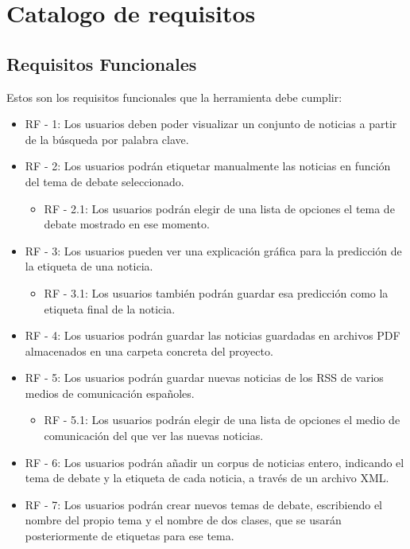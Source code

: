 \section{Catalogo de requisitos}

\subsection{Requisitos Funcionales}

Estos son los requisitos funcionales que la herramienta debe cumplir:

\begin{itemize}

\item RF - 1: Los usuarios deben poder visualizar un conjunto de noticias a partir de la búsqueda por palabra clave.

\item RF - 2: Los usuarios podrán etiquetar manualmente las noticias en función del tema de debate seleccionado.
\begin{itemize}
\item RF - 2.1: Los usuarios podrán elegir de una lista de opciones el tema de debate mostrado en ese momento.
\end{itemize}

\item RF - 3: Los usuarios pueden ver una explicación gráfica para la predicción de la etiqueta de una noticia.
\begin{itemize}
\item RF - 3.1: Los usuarios también podrán guardar esa predicción como la etiqueta final de la noticia.
\end{itemize}

\item RF - 4: Los usuarios podrán guardar las noticias guardadas en archivos PDF almacenados en una carpeta concreta del proyecto.

\item RF - 5: Los usuarios podrán guardar nuevas noticias de 
los RSS de varios medios de comunicación españoles.
\begin{itemize}
\item RF - 5.1: Los usuarios podrán elegir de una lista de opciones el medio de comunicación del que ver las nuevas noticias.
\end{itemize}

\item RF - 6: Los usuarios podrán añadir un corpus de noticias entero, indicando el tema de debate y la etiqueta de cada noticia, a través de un archivo XML.

\item RF - 7: Los usuarios podrán crear nuevos temas de debate, escribiendo el nombre del propio tema y el nombre de dos clases, que se usarán posteriormente de etiquetas para ese tema.

\end{itemize}

